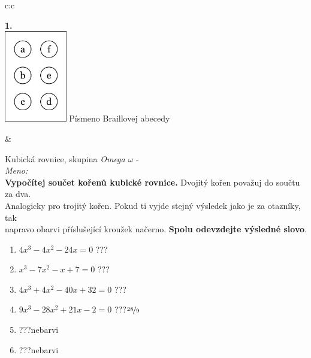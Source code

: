 \documentclass[10pt]{report}
\begin{document}
\begin{tabular}{c:c}
\begin{minipage}[c][99mm][t]{0.49\linewidth}
\begin{center}
\begin{minipage}{0.20\linewidth}
\begin{center}
{\Huge\bfseries 1.} \\[2mm]
\includegraphics[height=40mm]{../images/braille.png}
{\small Písmeno Braillovej abecedy}
\end{center}
\end{minipage}
\end{center}
\end{minipage}
&
\begin{minipage}[c][99mm][t]{0.49\linewidth}
\begin{center}
\vspace{7mm}
{\huge Kubická rovnice, skupina \textit{Omega $\omega$} -}\\[4.5mm]
\textit{Meno:}\phantom{xxxxxxxxxxxxxxxxxxxxxxxxxxxxxxxxxxxxxxxxxxxxxxxxxxxxxxxxxxxxxxxxx}\\[3.5mm]
\textbf{Vypočítej součet kořenů kubické rovnice.} Dvojitý kořen považuj do součtu za dva.\\Analogicky pro trojitý kořen. Pokud ti vyjde stejný výsledek jako je za otazníky, tak\\napravo obarvi příslušející kroužek načerno. \textbf{Spolu odevzdejte výsledné slovo}.\\[3mm]
\begin{minipage}{0.77\linewidth}
\begin{center}
\begin{varwidth}{\textwidth}
\begin{enumerate}
\large
\item $4x^3-4x^2-24x=0$\quad \dotfill\; ???\;\dotfill {}
\item $x^3-7x^2-x+7=0$\quad \dotfill\; ???\;\dotfill {}
\item $4x^3+4x^2-40x+32=0$\quad \dotfill\; ???\;\dotfill {}
\item $9x^3-28x^2+21x-2=0$\quad \dotfill\; ???\;\dotfill \quad $\nicefrac{28}{9}$
\item \quad \dotfill\; ???\;\dotfill \quad nebarvi
\item \quad \dotfill\; ???\;\dotfill \quad nebarvi
\end{enumerate}
\end{varwidth}

\end{center}
\end{minipage}
\end{center}
\end{minipage}
\end{tabular}
\end{document}
